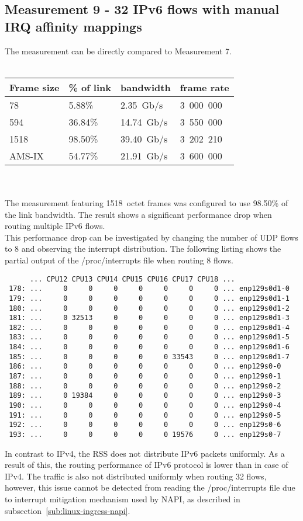 
\subsection{Measurement 9 - 32 IPv6 flows with manual IRQ affinity mappings}
The measurement can be directly compared to Measurement 7.
\\
\\
\begin{tabular}{ | l | l | l | l | }
\hline
Frame size & \% of link & bandwidth & frame rate \\
\hline
78     &  5.88\% &  2.35~Gb/s & 3~000~000 \\
594    & 36.84\% & 14.74~Gb/s & 3~550~000 \\
1518   & 98.50\% & 39.40~Gb/s & 3~202~210 \\
AMS-IX & 54.77\% & 21.91~Gb/s & 3~600~000 \\
\hline
\end{tabular}
\\
\\
The measurement featuring 1518~octet frames was configured to use 98.50\% of the link bandwidth.
The result shows a significant performance drop when routing multiple IPv6 flows.
\\
This performance drop can be investigated by changing the number of UDP flows to 8
and observing the interrupt distribution.
The following listing shows the partial output of the /proc/interrupts file when routing 8 flows.
\begin{lstlisting}
      ... CPU12 CPU13 CPU14 CPU15 CPU16 CPU17 CPU18 ...
 178: ...     0     0     0     0     0     0     0 ... enp129s0d1-0
 179: ...     0     0     0     0     0     0     0 ... enp129s0d1-1
 180: ...     0     0     0     0     0     0     0 ... enp129s0d1-2
 181: ...     0 32513     0     0     0     0     0 ... enp129s0d1-3
 182: ...     0     0     0     0     0     0     0 ... enp129s0d1-4
 183: ...     0     0     0     0     0     0     0 ... enp129s0d1-5
 184: ...     0     0     0     0     0     0     0 ... enp129s0d1-6
 185: ...     0     0     0     0     0 33543     0 ... enp129s0d1-7
 186: ...     0     0     0     0     0     0     0 ... enp129s0-0
 187: ...     0     0     0     0     0     0     0 ... enp129s0-1
 188: ...     0     0     0     0     0     0     0 ... enp129s0-2
 189: ...     0 19384     0     0     0     0     0 ... enp129s0-3
 190: ...     0     0     0     0     0     0     0 ... enp129s0-4
 191: ...     0     0     0     0     0     0     0 ... enp129s0-5
 192: ...     0     0     0     0     0     0     0 ... enp129s0-6
 193: ...     0     0     0     0     0 19576     0 ... enp129s0-7
\end{lstlisting}
In contrast to IPv4, the RSS does not distribute IPv6 packets uniformly.
As a result of this, the routing performance of IPv6 protocol is lower than in case of IPv4.
The traffic is also not distributed uniformly when routing 32 flows,
however, this issue cannot be detected from reading the /proc/interrupts file due to
interrupt mitigation mechanism used by NAPI, as described in subsection~\ref{sub:linux-ingress-napi}.
